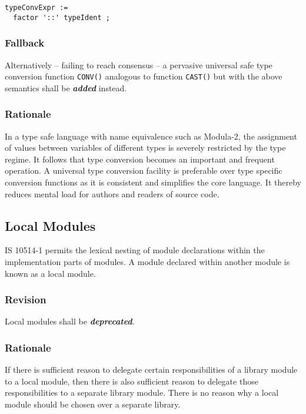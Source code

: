 \documentclass[10pt,a4paper,leqno,fleqn]{article}
\renewcommand{\emph}[1]{\textbf{\textit{#1}}}
\begin{document}
\begin{verbatim}
typeConvExpr :=
  factor '::' typeIdent ;
\end{verbatim}

\subsubsection{Fallback}

Alternatively -- failing to reach consensus -- a pervasive universal safe type
conversion function \verb|CONV()| analogous to function \verb|CAST()| but
with the above semantics shall be \emph{added} instead.

\subsubsection{Rationale}

In a type safe language with name equivalence such as Modula-2, the
assignment of values between variables of different types is severely restricted
by the type regime. It follows that type conversion becomes an important and
frequent operation. A universal type conversion facility is preferable over type
specific conversion functions as it is consistent and simplifies the core language.
It thereby reduces mental load for authors and readers of source code.


\subsection{Local Modules}

IS 10514-1 permits the lexical nesting of module declarations within the
implementation parts of modules. A module declared within another module
is known as a local module.

\subsubsection{Revision}

Local modules shall be \emph{deprecated}.

\subsubsection{Rationale}
If there is sufficient reason to delegate certain responsibilities of a library
module to a local module, then there is also sufficient reason to delegate
those responsibilities to a separate library module. There is no reason why a
local module should be chosen over a separate library.
\end{document}
